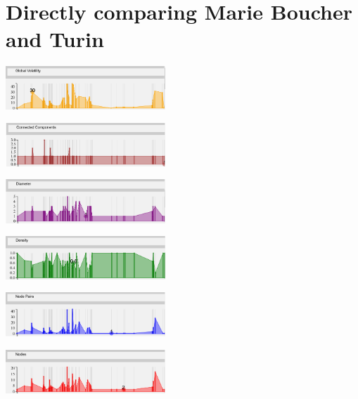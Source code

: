\section{Directly comparing Marie Boucher and Turin}
\begin{multicols}{2}
\begin{center}
\includegraphics[trim={0 0 0 0}, width=60mm]{./Figures/marieBoucherGlobalVolatility.png}
\end{center}
\begin{center}
\includegraphics[trim={0 0 0 0}, width=60mm]{./Figures/marieBoucherConnectedComponents.png}
\end{center}
\begin{center}
\includegraphics[trim={0 0 0 0}, width=60mm]{./Figures/marieBoucherDiameter.png}
\end{center}
\begin{center}
\includegraphics[trim={0 0 0 0}, width=60mm]{./Figures/marieBoucherDensity.png}
\end{center}
\begin{center}
\includegraphics[trim={0 0 0 0}, width=60mm]{./Figures/marieBoucherNodePairs.png}
\end{center}
\begin{center}
\includegraphics[trim={0 0 0 0}, width=60mm]{./Figures/marieBoucherNodes.png}

\end{center}
\end{multicols}

